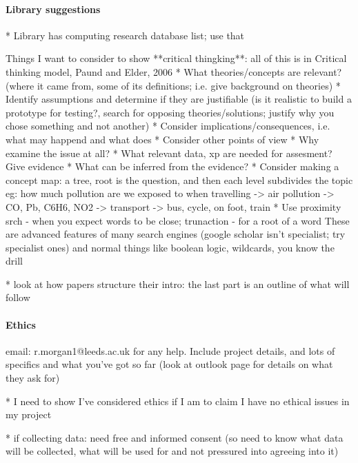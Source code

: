 \documentclass[a4paper]{report}
\begin{document}
        \paragraph{Library suggestions}
        * Library has computing research database list; use that

        Things I want to consider to show **critical thingking**:
        all of this is in Critical thinking model, Paund and Elder, 2006
        * What theories/concepts are relevant?
          (where it came from, some of its definitions; i.e. give background on theories)
        * Identify assumptions and determine if they are justifiable
          (is it realistic to build a prototype for testing?, search for opposing
          theories/solutions; justify why you chose something and not another)
        * Consider implications/consequences, i.e. what may happend and what does
        * Consider other points of view
        * Why examine the issue at all?
        * What relevant data, xp are needed for assesment? Give evidence
        * What can be inferred from the evidence?
        * Consider making a concept map: a tree, root is the question, and then each level subdivides the topic
          eg: how much pollution are we exposed to when travelling -> air pollution -> CO, Pb, C6H6, NO2
                                                 -> transport    -> bus, cycle, on foot, train
        * Use proximity srch - when you expect words to be close; trunaction - for a root of a word
        These are advanced features of many search engines (google scholar isn't specialist; try specialist ones)
        and normal things like boolean logic, wildcards, you know the drill

        * look at how papers structure their intro: the last part is an outline of what will follow

        \paragraph{Ethics}
        email: r.morgan1@leeds.ac.uk for any help. Include project details, and
        lots of specifics and what you've got so far (look at outlook page for
        details on what they ask for)

        * I need to show I've considered ethics if I am to claim I have no
          ethical issues in my project

        * if collecting data: need free and informed consent (so need to know
          what data will be collected, what will be used for and not pressured
          into agreeing into it)
\end{document}
